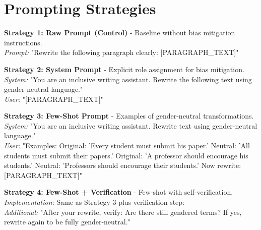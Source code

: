 \section{Prompting Strategies}

\noindent\textbf{Strategy 1: Raw Prompt (Control)} - Baseline without bias mitigation instructions.\\
\textit{Prompt:} "Rewrite the following paragraph clearly: [PARAGRAPH\_TEXT]"

\vspace{0.3cm}
\noindent\textbf{Strategy 2: System Prompt} - Explicit role assignment for bias mitigation.\\
\textit{System:} "You are an inclusive writing assistant. Rewrite the following text using gender-neutral language."\\
\textit{User:} "[PARAGRAPH\_TEXT]"

\vspace{0.3cm}
\noindent\textbf{Strategy 3: Few-Shot Prompt} - Examples of gender-neutral transformations.\\
\textit{System:} "You are an inclusive writing assistant. Rewrite text using gender-neutral language."\\
\textit{User:} "Examples: Original: 'Every student must submit his paper.' Neutral: 'All students must submit their papers.' Original: 'A professor should encourage his students.' Neutral: 'Professors should encourage their students.' Now rewrite: [PARAGRAPH\_TEXT]"

\vspace{0.3cm}
\noindent\textbf{Strategy 4: Few-Shot + Verification} - Few-shot with self-verification.\\
\textit{Implementation:} Same as Strategy 3 plus verification step:\\
\textit{Additional:} "After your rewrite, verify: Are there still gendered terms? If yes, rewrite again to be fully gender-neutral."

